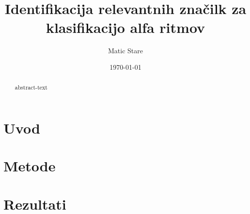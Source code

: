 \documentclass{article}
\begin{document}
\title{Identifikacija relevantnih značilk za klasifikacijo alfa ritmov}
\author{Matic Stare}
\date{\today}



\maketitle


\begin{abstract}
    abstract-text
\end{abstract}


\section{Uvod}
\label{sec:introduction}



\section{Metode}
\label{sec:methodology}


\section{Rezultati}
\label{sec:results}
\end{document}
